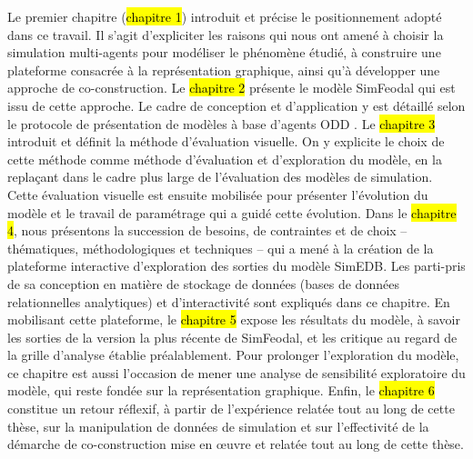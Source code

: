 Le premier chapitre (\hl{chapitre 1}) introduit et précise le positionnement adopté dans ce travail.
Il s'agit d'expliciter les raisons qui nous ont amené à choisir la simulation multi-agents pour modéliser le phénomène étudié, à construire une plateforme consacrée à la représentation graphique, ainsi qu'à développer une approche de co-construction.
Le \hl{chapitre 2} présente le modèle \og SimFeodal\fg{} qui est issu de cette approche. Le cadre de conception et d'application y est détaillé selon le protocole de présentation de modèles à base d'agents \og ODD\fg{} \autocite{grimm_odd_2010}.
Le \hl{chapitre 3} introduit et définit la méthode d'\og{}évaluation visuelle\fg{}.
On y explicite le choix de cette méthode comme méthode d'évaluation et d'exploration du modèle, en la replaçant dans le cadre plus large de l'évaluation des modèles de simulation.
Cette évaluation visuelle est ensuite mobilisée pour présenter l'évolution du modèle et le travail de \og paramétrage\fg{} qui a guidé cette évolution.
Dans le \hl{chapitre 4}, nous présentons la succession de besoins, de contraintes et de choix -- thématiques, méthodologiques et techniques -- qui a mené à la création de la plateforme interactive d'exploration des sorties du modèle SimEDB.
Les parti-pris de sa conception en matière de stockage de données (bases de données relationnelles analytiques) et d'interactivité sont expliqués dans ce chapitre.
En mobilisant cette plateforme, le \hl{chapitre 5} expose les résultats du modèle, à savoir les sorties de la version la plus récente de SimFeodal, et les critique au regard de la grille d'analyse établie préalablement.
Pour prolonger l'exploration du modèle, ce chapitre est aussi l'occasion de mener une analyse de sensibilité exploratoire du modèle, qui reste fondée sur la représentation graphique.
Enfin, le \hl{chapitre 6} constitue un retour réflexif, à partir de l'expérience relatée tout au long de cette thèse, sur la manipulation de données de simulation et sur l'effectivité de la démarche de co-construction mise en œuvre et relatée tout au long de cette thèse.


\clearpage
\FancyChapter